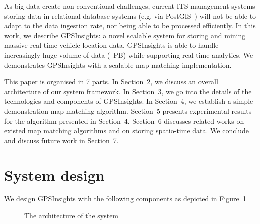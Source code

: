 \documentclass{acm_proc_article-sp}
\begin{document}
As big data create non-conventional challenges, current ITS management systems storing data in relational database systems (e.g. via PostGIS~\cite{posgis}) will not be able to adapt to the data ingestion rate, nor being able to be processed efficiently. In this work, we describe GPSInsights: a novel scalable system for storing and mining massive real-time vehicle location data. GPSInsights is able to handle increasingly huge volume of data (~PB) while supporting real-time analytics. We demonstrates GPSInsights with a scalable map matching implementation. 

This paper is organised in 7 parts. In Section~2, we discuss an overall architecture of our system framework. In Section~3, we go into the details of the technologies and components of GPSInsights. In Section~4, we establish a simple demonstration map matching algorithm. Section~5 presents experimental results for the algorithm presented in Section~4. Section~6 discusses related works on existed map matching algorithms and on storing spatio-time data. We conclude and discuss future work in Section~7.
	
\section{System design} 

We design GPSInsights with the following components as depicted  in Figure~\ref{architecture}

\begin{figure}[h]
\centering
{}
\caption{The architecture of the system}
\label{architecture}
\end{figure}
\end{document}
